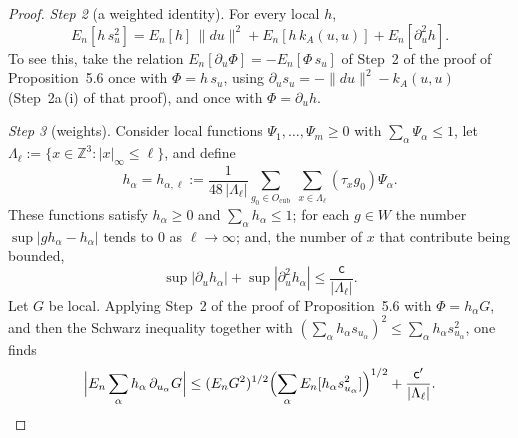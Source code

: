 \documentclass[11pt]{amsart}
\theoremstyle{definition}
\begin{document}
\begin{proof}
\emph{Step 2} (a weighted identity).
For every local $h$,
\begin{equation*}
E_n[h\,s_u^2]=E_n[h]\,\|du\|^2+E_n[h\,k_A(u,u)]+E_n[\partial_u^2h].
\end{equation*}
To see this, take the relation $E_n[\partial_u\Phi]=-E_n[\Phi\,s_u]$ of Step~2 of the proof of Proposition~5.6 once with $\Phi=h\,s_u$, using $\partial_us_u=-\|du\|^2-k_A(u,u)$ (Step~2a\,(i) of that proof),
and once with $\Phi=\partial_uh$.

\emph{Step 3} (weights).
Consider local functions $\Psi_1,\dots,\Psi_m\ge0$ with $\sum_\alpha\Psi_\alpha\le1$, let $\Lambda_\ell:=\{x\in\mathbb Z^3:|x|_\infty\le\ell\}$, and define
\begin{equation*}
h_\alpha=h_{\alpha,\ell}:=\frac{1}{48\,|\Lambda_\ell|}\sum_{g_0\in O_{\mathrm{cub}}}\ \sum_{x\in\Lambda_\ell}(\tau_xg_0)\Psi_\alpha.
\end{equation*}
These functions satisfy $h_\alpha\ge0$ and $\sum_\alpha h_\alpha\le1$;
for each $g\in W$ the number $\sup|gh_\alpha-h_\alpha|$ tends to $0$ as $\ell\to\infty$;
and, the number of $x$ that contribute being bounded,
\begin{equation*}
\sup|\partial_uh_\alpha|+\sup|\partial_u^2h_\alpha|\le\frac{\mathsf c}{|\Lambda_\ell|}.
\end{equation*}
Let $G$ be local.
Applying Step~2 of the proof of Proposition~5.6 with $\Phi=h_\alpha G$, and then the Schwarz inequality together with $(\sum_\alpha h_\alpha s_{u_\alpha})^2\le\sum_\alpha h_\alpha s_{u_\alpha}^2$, one finds
\begin{equation*}
\Bigl|E_n\sum_\alpha h_\alpha\,\partial_{u_\alpha}G\Bigr|\le(E_nG^2)^{1/2}\Bigl(\sum_\alpha E_n[h_\alpha s_{u_\alpha}^2]\Bigr)^{1/2}+\frac{\mathsf c'}{|\Lambda_\ell|}.
\end{equation*}


\end{proof}
\end{document}

